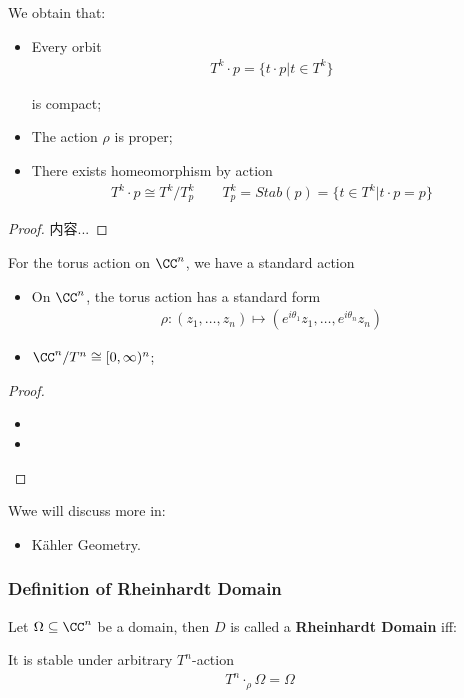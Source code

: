 \documentclass[Total.tex]{subfiles}
\begin{document}
		\begin{proposition}
			We obtain that:
			\begin{itemize}
				\item Every orbit 
				\begin{gather*}
					T^k\cdot p=\{t\cdot p|t\in T^k\}
				\end{gather*}
				
				is compact;
				\item The action $\rho$ is proper;
				\item There exists homeomorphism by action
				\begin{gather*}
					T^k\cdot p\cong T^k/T_p^k\qquad T_p^k=Stab(p)=\{t\in T^k|t\cdot p=p\}
				\end{gather*}
			\end{itemize}
		\end{proposition}
		\begin{proof}
			内容...
		\end{proof}
		
		For the torus action on $\CC^n$, we have a standard action
		\begin{proposition}
			\begin{itemize}
				\item On $\CC^n$, the torus action has a standard form
				\begin{gather*}
					\rho:(z_1,\dots,z_n)\mapsto (e^{i\theta_1}z_1,\dots,e^{i\theta_n}z_n)
				\end{gather*}
				\item $\CC^n/T^n\cong [0,\infty)^n$;
			\end{itemize}
		\end{proposition}
		\begin{proof}
			\begin{itemize}
				\item 
				\item 
			\end{itemize}
		\end{proof}
		
		Wwe will discuss more in:
		\begin{itemize}
			\item Kähler Geometry.
		\end{itemize}
		\subsubsection{Definition of Rheinhardt Domain}
		\begin{Def}
			Let $\Omega\subseteq \CC^n$ be a domain, then $D$ is called a \textbf{Rheinhardt Domain} iff: 
			
			It is stable under arbitrary $T^n$-action
			\begin{gather*}
				T^n\cdot_\rho \Omega=\Omega
			\end{gather*}
		\end{Def}
		
\end{document}
